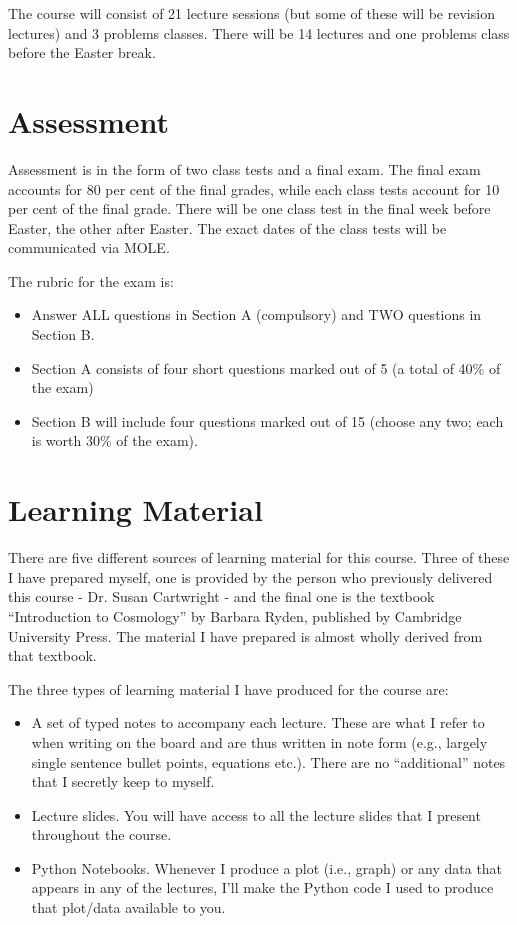\documentclass[11pt]{article}
\begin{document}
    The course will consist of 21 lecture sessions (but some of these will be revision lectures) and 3 problems classes. There will be 14 lectures and one problems class before the Easter break. 

    \section{Assessment}
    Assessment is in the form of two class tests and a final exam. The final exam accounts for 80 per cent of the final grades, while each class tests account for 10 per cent of the final grade. There will be one class test in the final week before Easter, the other after Easter. The exact dates of the class tests will be communicated via MOLE.

    The rubric for the exam is: 
    
    \begin{itemize}
        \item Answer ALL questions in Section A (compulsory) and TWO questions in Section B.
        \item Section A consists of four short questions marked out of 5 (a total of 40\% of the exam)
        \item Section B will include four questions marked out of 15 (choose any two; each is worth 30\% of the exam).
    \end{itemize}

    \section{Learning Material}
    There are five different sources of learning material for this course. Three of these I have prepared myself, one is provided by the person who previously delivered this course - Dr. Susan Cartwright - and the final one is the textbook ``Introduction to Cosmology'' by Barbara Ryden, published by Cambridge University Press. The material I have prepared is almost wholly derived from that textbook.
    
    The three types of learning material I have produced for the course are:
    \begin{itemize}
    \item A set of typed notes to accompany each lecture. These are what I refer to when writing on the board and are thus written in note form (e.g., largely single sentence bullet points, equations etc.). There are no ``additional'' notes that I secretly keep to myself.
    \item Lecture slides. You will have access to all the lecture slides that I present throughout the course.
    \item Python Notebooks. Whenever I produce a plot (i.e., graph) or any data that appears in any of the lectures, I'll make the Python code I used to produce that plot/data available to you.

    \end{itemize}
\end{document}
